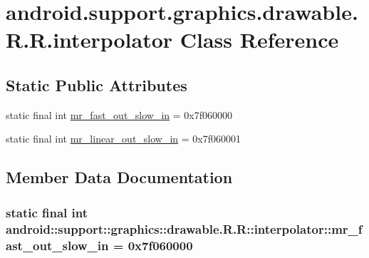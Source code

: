 \hypertarget{classandroid_1_1support_1_1graphics_1_1drawable_1_1_r_1_1interpolator}{
\section{android.support.graphics.drawable.R.R.interpolator Class Reference}
\label{classandroid_1_1support_1_1graphics_1_1drawable_1_1_r_1_1interpolator}
}
\subsection*{Static Public Attributes}
\begin{CompactItemize}
\item 
static final int \hyperlink{classandroid_1_1support_1_1graphics_1_1drawable_1_1_r_1_1interpolator_6b75070970a334fd2756327e46b76919}{mr\_\-fast\_\-out\_\-slow\_\-in} = 0x7f060000
\item 
static final int \hyperlink{classandroid_1_1support_1_1graphics_1_1drawable_1_1_r_1_1interpolator_758fc9667b9fde3de4bb12963f60d626}{mr\_\-linear\_\-out\_\-slow\_\-in} = 0x7f060001
\end{CompactItemize}


\subsection{Member Data Documentation}
\hypertarget{classandroid_1_1support_1_1graphics_1_1drawable_1_1_r_1_1interpolator_6b75070970a334fd2756327e46b76919}{
\subsubsection[{mr\_\-fast\_\-out\_\-slow\_\-in}]{\setlength{\rightskip}{0pt plus 5cm}static final int android::support::graphics::drawable.R.R::interpolator::mr\_\-fast\_\-out\_\-slow\_\-in = 0x7f060000}}
\label{classandroid_1_1support_1_1graphics_1_1drawable_1_1_r_1_1interpolator_6b75070970a334fd2756327e46b76919}


